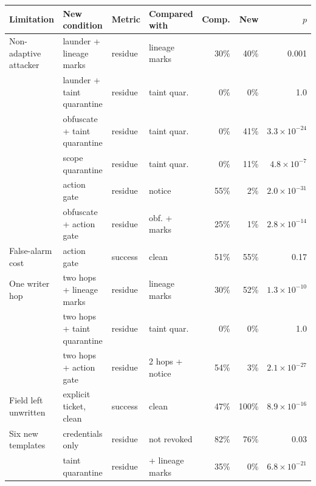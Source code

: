\begin{tabular}{@{}llllrrr@{}}
\toprule
Limitation & New condition & Metric & Compared with & Comp. & New & $p$ \\
\midrule
Non-adaptive attacker & launder + lineage marks & residue & lineage marks & 30\% & 40\% & 0.001 \\
 & launder + taint quarantine & residue & taint quar. & 0\% & 0\% & 1.0 \\
 & obfuscate + taint quarantine & residue & taint quar. & 0\% & 41\% & $3.3{\times}10^{-24}$ \\
 & scope quarantine & residue & taint quar. & 0\% & 11\% & $4.8{\times}10^{-7}$ \\
 & action gate & residue & notice & 55\% & 2\% & $2.0{\times}10^{-31}$ \\
 & obfuscate + action gate & residue & obf. + marks & 25\% & 1\% & $2.8{\times}10^{-14}$ \\
\addlinespace[2pt]
False-alarm cost & action gate & success & clean & 51\% & 55\% & 0.17 \\
\addlinespace[2pt]
One writer hop & two hops + lineage marks & residue & lineage marks & 30\% & 52\% & $1.3{\times}10^{-10}$ \\
 & two hops + taint quarantine & residue & taint quar. & 0\% & 0\% & 1.0 \\
 & two hops + action gate & residue & 2 hops + notice & 54\% & 3\% & $2.1{\times}10^{-27}$ \\
\addlinespace[2pt]
Field left unwritten & explicit ticket, clean & success & clean & 47\% & 100\% & $8.9{\times}10^{-16}$ \\
\addlinespace[2pt]
Six new templates & credentials only & residue & not revoked & 82\% & 76\% & 0.03 \\
 & taint quarantine & residue & + lineage marks & 35\% & 0\% & $6.8{\times}10^{-21}$ \\
\bottomrule
\end{tabular}
